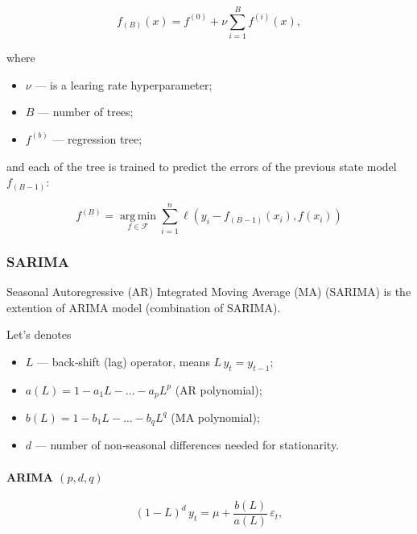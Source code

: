 \documentclass{article}
\DeclareMathOperator*{\argmin}{arg\,min}
\newcommand{\Models}{\mathcal{F}}
\begin{document}
\begin{equation}
    f_{(B)}(x) = f^{(0)} + \nu\sum\limits_{i=1}^{B}{f^{(i)}(x)},
\end{equation}

where

\begin{itemize}
    \item \(\nu\) --- is a learing rate hyperparameter;
    \item \(B\) --- number of trees;
    \item \(f^{(b)}\) --- regression tree;
\end{itemize}

and each of the tree is trained to predict the errors of the previous state model \(f_{(B-1)}\):

\begin{equation}
    f^{(B)} = \argmin\limits_{f\in\Models}{\sum_{i=1}^{n}{\ell(y_i - f_{(B-1)}(x_i), f(x_i))}}
\end{equation}


\subsubsection{SARIMA}
\label{model:sarima}

Seasonal Autoregressive (AR) Integrated Moving Average (MA) (SARIMA) is the extention of ARIMA model (combination of SARIMA).

Let's denotes
\begin{itemize}
    \item \(L\) --- back‑shift (lag) operator, means \(L\,y_{t}=y_{t-1}\);
    \item \(a(L)=1-a_{1}L-\dots-a_{p}L^{p}\) (AR polynomial);
    \item \(b(L)=1-b_{1}L-\dots-b_{q}L^{q}\) (MA polynomial);
    \item \(d\) --- number of non‑seasonal differences needed for stationarity.
\end{itemize}

\paragraph{ARIMA \texorpdfstring{\((p,d,q)\)}{(p,d,q)}}

\begin{equation}
    (1-L)^{d}\,y_{t} = \mu + \frac{b(L)}{a(L)}\,\varepsilon_{t},
\end{equation}
\end{document}
